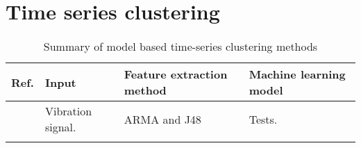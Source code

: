 \newpage
\section{Time series clustering}

\begin{longtable}{p{}p{}p{}p{}}
    \hline
    Ref. & Input & Feature extraction method & Machine learning model \\
    \hline \hline
    \cite{ml_cm_wt_blade_ARMA_2018} & Vibration signal. & ARMA and J48 & Tests. \\  \hline
    \hline
    \caption{Summary of model based time-series clustering methods}
    \label{tab:machine_learning_wt_cm_summary}
\end{longtable}